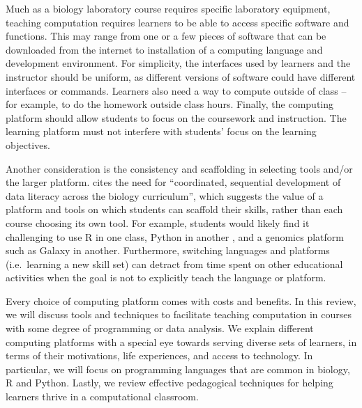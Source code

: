 Much as a biology laboratory course requires specific laboratory equipment, teaching computation requires learners to be able to access specific software and functions.
This may range from one or a few pieces of software that can be downloaded from the internet
to installation of a computing language and development environment.
For simplicity,
the interfaces used by learners and the instructor should be uniform, as different versions of software could have different interfaces or commands.
Learners also need  a way to compute outside of class -- for example, to do the homework outside class hours.
Finally, the computing platform should allow students to focus on the coursework and instruction. 
The learning platform must not interfere with students' focus on the learning objectives.

Another consideration is the consistency and scaffolding in selecting tools and/or the larger platform.
\citet{Gibson18} cites the need for ``coordinated, sequential development of data literacy across the biology curriculum'',
which suggests the value of a platform and tools on which students can scaffold their skills,
rather than each course choosing its own tool.
For example, students would likely find it challenging to use R in one class,
Python in another \citep{wu1990}, and a genomics platform such as Galaxy in another.
Furthermore, switching languages and platforms (i.e.\ learning a new skill set)
can detract from time spent on other educational activities when the goal is not to explicitly teach the language or platform.

Every choice of computing platform comes with costs and benefits. 
In this review, we will discuss tools and techniques to facilitate teaching computation in courses with some degree of programming or data analysis.
We explain different computing platforms with a special eye towards serving diverse sets of learners, 
in terms of their motivations, life experiences, and access to technology.
In particular, we will focus on programming languages that are common in biology, R and Python. 
Lastly, we review effective pedagogical techniques for helping learners thrive in a computational classroom.

